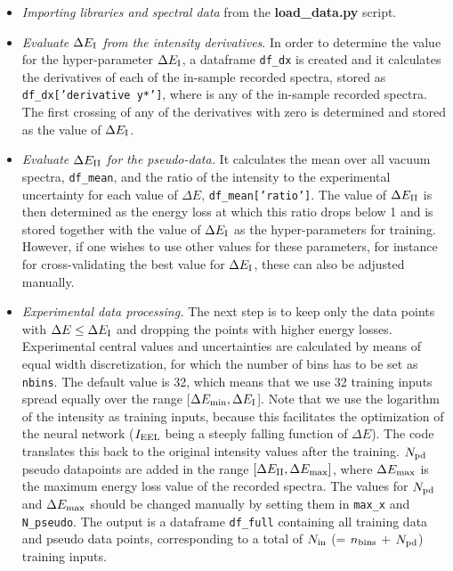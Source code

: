 \begin{itemize}
  
\item {\it Importing libraries and spectral data} from the {\bf load\_data.py} script.

\item {\it Evaluate  $\Delta E_{\rm I}$ from the intensity derivatives}.
  In order to determine the value for the hyper-parameter
  $\Delta E_{\rm I}$, a dataframe {\tt df\_dx} is created
and it calculates the derivatives of each of the in-sample recorded spectra, 
stored as {\tt df\_dx['derivative y*']}, where {\tt *} is any of the in-sample recorded spectra.
%
The first crossing of any of the derivatives with zero is determined 
and stored as the value of $\Delta E_{\rm I}$. 

\item {\it Evaluate $\Delta E_{\rm II}$ for the pseudo-data.}
It calculates the mean over all vacuum spectra, {\tt df\_mean}, and the ratio of the 
intensity to the experimental uncertainty for each value of
$\Delta E$, {\tt df\_mean['ratio']}. 
%
The value of $\Delta E_{\rm II}$ is then determined as the energy loss at which this ratio
drops below 1 and  is stored together with the value of $\Delta E_{\rm I}$
as the hyper-parameters for training. 
%
However, if one wishes to use other values for these parameters, for instance for 
cross-validating the best value for $\Delta E_{\rm I}$, these can also be adjusted manually.

\item {\it Experimental data processing.}
%
  The next step is to keep only
  the data points with $\Delta E \le \Delta E_{\rm I}$  
and dropping the points with higher energy losses.
%
Experimental central values and uncertainties are calculated by means of equal width 
discretization, for which the number of bins has to be set as {\tt nbins}. 
%
The default value is 32, which means that we use 32 training inputs spread equally
over the range [$ \Delta E_{\rm min}, \Delta E_{\rm I}$]. 
%
Note that we use the logarithm of the intensity as training inputs, because this facilitates
the optimization of the neural network ($I_{\rm EEL}$ being a steeply falling function
of $\Delta E$).
%
The code translates this back to the original intensity values after the training.
%
$N_{\rm pd}$
pseudo datapoints are added in the range $[\Delta E_{\rm II}, \Delta E_{\rm max}]$, where
$ \Delta E_{\rm max}$
is the maximum energy loss value of the recorded spectra. 
%
The values for $N_{\rm pd}$ and $\Delta E_{\rm max}$ should be changed manually by 
setting them in {\tt max\_x} and {\tt N\_pseudo}. 
%
The output is a dataframe {\tt df\_full} containing all training data and pseudo data points, 
corresponding to a total of $N_{\rm in}$ (= $n_{\rm bins}$ + $N_{\rm pd}$) training inputs.


\end{itemize}
